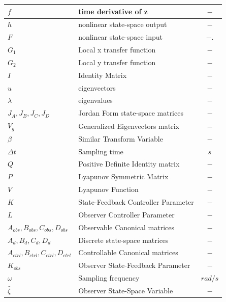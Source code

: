 \documentclass[conference]{IEEEtran}
\begin{document}
\begin{table}[htbp]
\begin{center}
\begin{tabular}{|p{2.9cm}|p{4.25cm}|c|}
\hline
$f$ & time derivative of z & $-$\\
\hline
$h$ & nonlinear state-space output & $-$\\
\hline
$F$ & nonlinear state-space input & $-$.\\
\hline
$G_1$ & Local x transfer function & $-$\\
\hline
$G_2$ & Local y transfer function & $-$\\
\hline
$I$ & Identity Matrix &$-$ \\
\hline
$u$ & eigenvectors & $-$\\
\hline
$\lambda$ & eigenvalues & $-$\\
\hline
$J_A,J_B,J_C,J_D$ & Jordan Form state-space matrices  & $-$ \\
\hline
$V_g$ & Generalized Eigenvectors matrix & $-$ \\
\hline
$\beta$ & Similar Transform Variable & $-$ \\
\hline
$\Delta t$ & Sampling time & $s$ \\
\hline
$Q$ & Positive Definite Identity matrix & $-$ \\
\hline
$P$ & Lyapunov Symmetric Matrix & $-$ \\
\hline
$V$ & Lyapunov Function & $-$ \\
\hline
$K$ & State-Feedback Controller Parameter & $-$ \\
\hline
$L$ & Observer Controller Parameter & $-$ \\
\hline
$A_{obs},B_{obs},C_{obs},D_{obs}$ & Observable Canonical matrices  & $-$ \\
\hline
$A_d,B_d,C_d,D_d$ & Discrete state-space matrices  & $-$ \\
\hline
$A_{ctrl},B_{ctrl},C_{ctrl},D_{ctrl}$ & Controllable Canonical matrices  & $-$ \\
\hline
$K_{obs}$ & Observer State-Feedback Parameter & $-$ \\
\hline
$\omega$ & Sampling frequency & $rad/s$\\ 
\hline
$\hat{\zeta}$ & Observer State-Space Variable & $-$\\ 
\hline
\end{tabular}
\end{center}
\vspace{-5mm}
\end{table}
\end{document}
